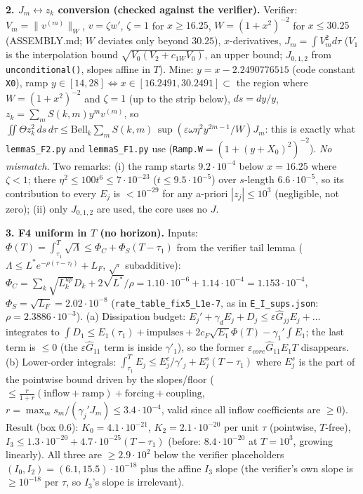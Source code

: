 \documentclass[11pt]{article}
\begin{document}
\textbf{2. $J_m\leftrightarrow z_k$ conversion (checked against the verifier).} Verifier: $V_m=\|v^{(m)}\|_W$, $v=\zeta w'$, $\zeta=1$ for $x\ge16.25$, $W=(1+x^2)^{-2}$ for $x\le30.25$ (ASSEMBLY.md; $W$ deviates only beyond $30.25$), $x$-derivatives, $J_m=\int V_m^2d\tau$ ($V_1$ is the interpolation bound $\sqrt{V_0(V_2+c_{1W}V_0)}$, an upper bound; $J_{0,1,2}$ from \texttt{unconditional()}, slopes affine in $T$). Mine: $y=x-2.2490776515$ (code constant \texttt{X0}), ramp $y\in[14,28]\Leftrightarrow x\in[16.2491,30.2491]\subset$ the region where $W=(1+x^2)^{-2}$ and $\zeta=1$ (up to the strip below), $ds=dy/y$, $z_k=\sum_mS(k,m)y^mv^{(m)}$, so $\iint\Theta z_k^2\,ds\,d\tau\le\mathrm{Bell}_k\sum_mS(k,m)^{\,}\sup(\varepsilon\omega\eta^2y^{2m-1}/W)J_m$: this is exactly what \texttt{lemmaS\_F2.py} and \texttt{lemmaS\_F1.py} use (\texttt{Ramp.W}$=(1+(y+X_0)^2)^{-2}$). \emph{No mismatch.} Two remarks: (i) the ramp starts $9.2\cdot10^{-4}$ below $x=16.25$ where $\zeta<1$; there $\eta^2\le100t^6\le7\cdot10^{-23}$ ($t\le9.5\cdot10^{-5}$) over $s$-length $6.6\cdot10^{-5}$, so its contribution to every $E_j$ is $<10^{-29}$ for any a-priori $|z_j|\le10^3$ (negligible, not zero); (ii) only $J_{0,1,2}$ are used, the core uses no $J$.

\textbf{3. F4 uniform in $T$ (no horizon).} Inputs: $\Phi(T)=\int_{\tau_1}^T\sqrt\Lambda\le\Phi_C+\Phi_S(T-\tau_1)$ from the verifier tail lemma ($\Lambda\le L^*e^{-\rho(\tau-\tau_t)}+L_F$, $\sqrt{\cdot}$ subadditive): $\Phi_C=\sum_{k}\sqrt{L^{up}_k}D_k+2\sqrt{L^*}/\rho=1.10\cdot10^{-6}+1.14\cdot10^{-4}=1.153\cdot10^{-4}$, $\Phi_S=\sqrt{L_F}=2.02\cdot10^{-8}$ (\texttt{rate\_table\_fix5\_L1e-7}, as in \texttt{E\_I\_sups.json}: $\rho=2.3886\cdot10^{-3}$). (a) Dissipation budget: $E_j'+\gamma_dE_j+D_j\le\varepsilon\hat G_{jj}E_j+\dots$ integrates to $\int D_1\le E_1(\tau_1)+\text{impulses}+2c_F\sqrt{E_1}\Phi(T)-\gamma_1'\!\int E_1$; the last term is $\le0$ (the $\varepsilon\hat G_{11}$ term is inside $\gamma'_1$), so the former $\varepsilon_{core}\hat G_{11}E_1T$ disappears. (b) Lower-order integrals: $\int_{\tau_1}^TE_j\le E_j^c/\gamma'_j+E_j^s(T-\tau_1)$ where $E_j^s$ is the part of the pointwise bound driven by the slopes/floor ($\le\frac{r}{1+r}(\text{inflow}+\text{ramp})+\text{forcing}+\text{coupling}$, $r=\max_ms_m/(\gamma_j'J_m)\le3.4\cdot10^{-4}$, valid since all inflow coefficients are $\ge0$). Result (box $0.6$): $K_0=4.1\cdot10^{-21}$, $K_2=2.1\cdot10^{-20}$ per unit $\tau$ (pointwise, $T$-free), $I_3\le1.3\cdot10^{-20}+4.7\cdot10^{-25}(T-\tau_1)$ (before: $8.4\cdot10^{-20}$ at $T=10^3$, growing linearly). All three are $\ge2.9\cdot10^2$ below the verifier placeholders $(I_0,I_2)=(6.1,15.5)\cdot10^{-18}$ plus the affine $I_3$ slope (the verifier's own slope is $\ge10^{-18}$ per $\tau$, so $I_3$'s slope is irrelevant).
\end{document}
